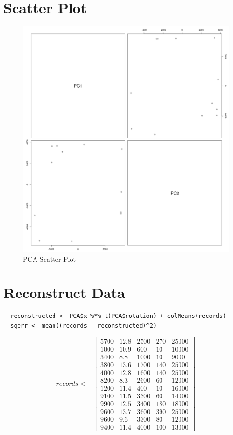 \documentclass{report}
\begin{document}
\section{Scatter Plot}

\begin{figure}[H]
	\includegraphics[width=\linewidth]{pca_scatter_plot.png}
	 \caption{PCA Scatter Plot}
	\label{fig:PCA Scatter Plot}
\end{figure}

\section{Reconstruct Data}

\begin{verbatim}	
  reconstructed <- PCA$x %*% t(PCA$rotation) + colMeans(records)
  sqerr <- mean((records - reconstructed)^2)
\end{verbatim}

\[
  records <- 
  \begin{bmatrix}
    5700 & 12.8 & 2500 & 270 & 25000 \\
    1000 & 10.9 & 600 & 10 & 10000 \\
    3400 & 8.8 & 1000 & 10 & 9000 \\
    3800 & 13.6 & 1700 & 140 & 25000 \\
    4000 & 12.8 & 1600 & 140 & 25000 \\
    8200 & 8.3 & 2600 & 60 & 12000 \\
    1200 & 11.4 & 400 & 10 & 16000 \\
    9100 & 11.5 & 3300 & 60 & 14000 \\
    9900 & 12.5 & 3400 & 180 & 18000 \\
    9600 & 13.7 & 3600 & 390 & 25000 \\
    9600 & 9.6 & 3300 & 80 & 12000 \\
    9400 & 11.4 & 4000 & 100 & 13000
  \end{bmatrix}
\]
\end{document}
